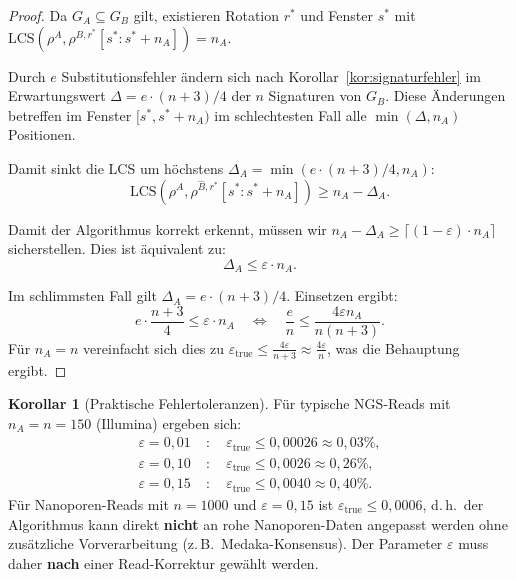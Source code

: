 ﻿\documentclass[a4paper,12pt]{article}
\theoremstyle{definition}
\newtheorem{korollar}{Korollar}
\begin{document}
\begin{proof}
    Da $G_A \subseteq G_B$ gilt, existieren Rotation $r^*$ und Fenster $s^*$
    mit $\mathrm{LCS}(\rho^A, \rho^{B,r^*}[s^*:s^*+n_A]) = n_A$.

    Durch $e$ Substitutionsfehler \"{a}ndern sich nach
    Korollar~\ref{kor:signaturfehler} im Erwartungswert
    $\Delta = e \cdot (n+3)/4$ der $n$ Signaturen von $G_B$.
    Diese \"{A}nderungen betreffen im Fenster $[s^*, s^*+n_A)$ im
    schlechtesten Fall alle $\min(\Delta, n_A)$ Positionen.

    Damit sinkt die LCS um h\"{o}chstens $\Delta_A = \min(e \cdot (n+3)/4, n_A)$:
    \[
        \mathrm{LCS}(\rho^A, \rho^{\hat{B},r^*}[s^*:s^*+n_A])
        \geq n_A - \Delta_A.
    \]

    Damit der Algorithmus korrekt erkennt, m\"{u}ssen wir
    $n_A - \Delta_A \geq \lceil(1-\varepsilon) \cdot n_A\rceil$ sicherstellen.
    Dies ist \"{a}quivalent zu:
    \[
        \Delta_A \leq \varepsilon \cdot n_A.
    \]

    Im schlimmsten Fall gilt $\Delta_A = e \cdot (n+3)/4$. Einsetzen ergibt:
    \[
        e \cdot \frac{n+3}{4} \leq \varepsilon \cdot n_A
        \quad \Longleftrightarrow \quad
        \frac{e}{n} \leq \frac{4\varepsilon n_A}{n(n+3)}.
    \]
    F\"{u}r $n_A = n$ vereinfacht sich dies zu
    $\varepsilon_{\mathrm{true}} \leq \frac{4\varepsilon}{n+3}
    \approx \frac{4\varepsilon}{n}$, was die Behauptung ergibt. 
\end{proof}

\begin{korollar}[Praktische Fehlertoleranzen]
    \label{kor:toleranzen}
    F\"{u}r typische NGS-Reads mit $n_A = n = 150$ (Illumina) ergeben sich:
    \begin{align*}
        \varepsilon = 0{,}01 &\;:\quad \varepsilon_{\text{true}} \leq 0{,}00026
        \approx 0{,}03\%, \\
        \varepsilon = 0{,}10 &\;:\quad \varepsilon_{\text{true}} \leq 0{,}0026
        \approx 0{,}26\%, \\
        \varepsilon = 0{,}15 &\;:\quad \varepsilon_{\text{true}} \leq 0{,}0040
        \approx 0{,}40\%.
    \end{align*}
    F\"{u}r Nanoporen-Reads mit $n = 1000$ und $\varepsilon = 0{,}15$ ist
    $\varepsilon_{\text{true}} \leq 0{,}0006$, d.\,h.\ der Algorithmus kann
    direkt \textbf{nicht} an rohe Nanoporen-Daten angepasst werden ohne
    zus\"{a}tzliche Vorverarbeitung (z.\,B.\ Medaka-Konsensus). Der Parameter
    $\varepsilon$ muss daher \textbf{nach} einer Read-Korrektur gew\"{a}hlt werden.
\end{korollar}
\end{document}
